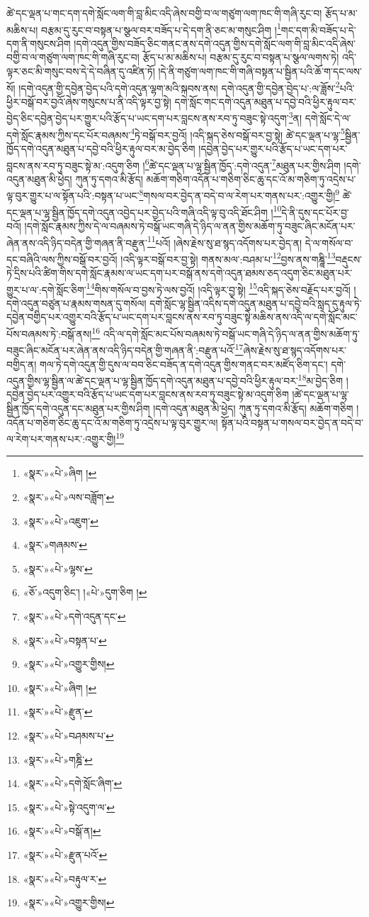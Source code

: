 ཚེ་དང་ལྡན་པ་གང་དག་དགེ་སློང་ལག་གི་བླ་མིང་འདི་ཞེས་བགྱི་བ་ལ་གཙུག་ལག་ཁང་གི་གཞི་རུང་བ། རྩོད་པ་མ་མཆིས་པ། བརྩམ་དུ་རུང་བ་བསྟན་པ་སྩལ་བར་བཟོད་པ་དེ་དག་ནི་ཅང་མ་གསུང་ཤིག །\footnote{«སྣར་»«པེ་»ཞིག །}གང་དག་མི་བཟོད་པ་དེ་དག་ནི་གསུངས་ཤིག །དགེ་འདུན་གྱིས་བཟོད་ཅིང་གནང་ནས་དགེ་འདུན་གྱིས་དགེ་སློང་ལག་གི་བླ་མིང་འདི་ཞེས་བགྱི་བ་ལ་གཙུག་ལག་ཁང་གི་གཞི་རུང་བ། རྩོད་པ་མ་མཆིས་པ། བརྩམ་དུ་རུང་བ་བསྟན་པ་སྩལ་ལགས་ཏེ། འདི་ལྟར་ཅང་མི་གསུང་བས་དེ་དེ་བཞིན་དུ་འཛིན་ཏོ། །དེ་ནི་གཙུག་ལག་ཁང་གི་གཞི་བསྟན་པ་སྦྱིན་པའི་ཆོ་ག་དང་ལས་སོ། །དགེ་འདུན་གྱི་དབྱེན་བྱེད་པའི་དགེ་འདུན་ལྷག་མའི་སྐབས་ནས། དགེ་འདུན་གྱི་དབྱེན་བྱེད་པ་:ལ་ཟློས་\footnote{«སྣར་»«པེ་»ལས་བཟློག་}པའི་ཕྱིར་བསྒོ་བར་བྱའོ་ཞེས་གསུངས་པ་ནི་འདི་ལྟར་བྱ་སྟེ། དགེ་སློང་གང་དགེ་འདུན་མཐུན་པ་དབྱེ་བའི་ཕྱིར་རྟུལ་བར་བྱེད་ཅིང་དབྱེན་བྱེད་པར་གྱུར་པའི་རྩོད་པ་ཡང་དག་པར་བླངས་ནས་རབ་ཏུ་བཟུང་སྟེ་འདུག་\footnote{«སྣར་»«པེ་»འཇུག་}ན། དགེ་སློང་དེ་ལ་དགེ་སློང་རྣམས་ཀྱིས་དང་པོར་བཞམས་\footnote{«སྣར་»གཞམས་}ཏེ་བསྒོ་བར་བྱའོ། །འདི་སྐད་ཅེས་བསྒོ་བར་བྱ་སྟེ། ཚེ་དང་ལྡན་པ་ལྷ་\footnote{«སྣར་»«པེ་»ལྷས་}སྦྱིན་ཁྱོད་དགེ་འདུན་མཐུན་པ་དབྱེ་བའི་ཕྱིར་རྟུལ་བར་མ་བྱེད་ཅིག །དབྱེན་བྱེད་པར་གྱུར་པའི་རྩོད་པ་ཡང་དག་པར་བླངས་ནས་རབ་ཏུ་བཟུང་སྟེ་མ་:འདུག་ཅིག །\footnote{«ཅོ་»འདུག་ཅིང་། །«པེ་»དུག་ཅིག །}ཚེ་དང་ལྡན་པ་ལྷ་སྦྱིན་ཁྱོད་:དགེ་འདུན་\footnote{«སྣར་»«པེ་»དགེ་འདུན་དང་}མཐུན་པར་གྱིས་ཤིག །དགེ་འདུན་མཐུན་མི་ཕྱེད། ཀུན་ཏུ་དགའ་མི་རྩོད། མཆོག་གཅིག་འདོན་པ་གཅིག་ཅིང་ཆུ་དང་འོ་མ་གཅིག་ཏུ་འདྲེས་པ་ལྟ་བུར་གྱུར་པ་ལ་སྟོན་པའི་:བསྟན་པ་ཡང་\footnote{«སྣར་»«པེ་»བསྟན་པ་}གསལ་བར་བྱེད་ན་བདེ་བ་ལ་རེག་པར་གནས་པར་:འགྱུར་གྱི།\footnote{«སྣར་»«པེ་»འགྱུར་གྱིས།} ཚེ་དང་ལྡན་པ་ལྷ་སྦྱིན་ཁྱོད་དགེ་འདུན་འབྱེད་པར་བྱེད་པའི་གཞི་འདི་ལྟ་བུ་འདི་ཐོང་ཤིག །\footnote{«སྣར་»«པེ་»ཞིག །}དེ་ནི་དུས་དང་པོར་བྱ་བའོ། །དགེ་སློང་རྣམས་ཀྱིས་དེ་ལ་བཞམས་ཏེ་བསྒོ་ཡང་གཞི་དེ་ཉིད་ལ་ནན་གྱིས་མཆོག་ཏུ་བཟུང་ཞིང་མངོན་པར་ཞེན་ནས་འདི་ཉིད་བདེན་གྱི་གཞན་ནི་བརྫུན་\footnote{«སྣར་»«པེ་»རྫུན་}པའོ། །ཞེས་རྗེས་སུ་ཐ་སྙད་འདོགས་པར་བྱེད་ན། དེ་ལ་གསོལ་བ་དང་བཞིའི་ལས་ཀྱིས་བསྒོ་བར་བྱའོ། །འདི་ལྟར་བསྒོ་བར་བྱ་སྟེ། གནས་མལ་:བཤམ་པ་\footnote{«སྣར་»«པེ་»བཤམས་པ་}བྱས་ནས་གཎྜཱི་\footnote{«སྣར་»«པེ་»གཎྜི་}བརྡུངས་ཏེ་དྲིས་པའི་ཚིག་གིས་དགེ་སློང་རྣམས་ལ་ཡང་དག་པར་བསྒོ་ནས་དགེ་འདུན་ཐམས་ཅད་འདུག་ཅིང་མཐུན་པར་གྱུར་པ་ལ་:དགེ་སློང་ཅིག་\footnote{«སྣར་»«པེ་»དགེ་སློང་ཞིག་}གིས་གསོལ་བ་བྱས་ཏེ་ལས་བྱའོ། །འདི་ལྟར་བྱ་སྟེ། \footnote{«སྣར་»«པེ་»སྟེ་འདུག་ལ་}འདི་སྐད་ཅེས་བརྗོད་པར་བྱའོ། །དགེ་འདུན་བཙུན་པ་རྣམས་གསན་དུ་གསོལ། དགེ་སློང་ལྷ་སྦྱིན་འདིས་དགེ་འདུན་མཐུན་པ་དབྱེ་བའི་སླད་དུ་རྟུལ་ཏེ་དབྱེན་བགྱིད་པར་འགྱུར་བའི་རྩོད་པ་ཡང་དག་པར་བླངས་ནས་རབ་ཏུ་བཟུང་སྟེ་མཆིས་ནས་འདི་ལ་དགེ་སློང་མང་པོས་བཞམས་ཏེ་:བསྒོ་ནས།\footnote{«སྣར་»«པེ་»བསྒོ་ན།} འདི་ལ་དགེ་སློང་མང་པོས་བཞམས་ཏེ་བསྒོ་ཡང་གཞི་དེ་ཉིད་ལ་ནན་གྱིས་མཆོག་ཏུ་བཟུང་ཞིང་མངོན་པར་ཞེན་ནས་འདི་ཉིད་བདེན་གྱི་གཞན་ནི་:བརྫུན་པའོ་\footnote{«སྣར་»«པེ་»རྫུན་པའོ་}ཞེས་རྗེས་སུ་ཐ་སྙད་འདོགས་པར་བགྱིད་ན། གལ་ཏེ་དགེ་འདུན་གྱི་དུས་ལ་བབ་ཅིང་བཟོད་ན་དགེ་འདུན་གྱིས་གནང་བར་མཛོད་ཅིག་དང་། དགེ་འདུན་གྱིས་ལྷ་སྦྱིན་ལ་ཚེ་དང་ལྡན་པ་ལྷ་སྦྱིན་ཁྱོད་དགེ་འདུན་མཐུན་པ་དབྱེ་བའི་ཕྱིར་རྟུལ་བར་\footnote{«སྣར་»«པེ་»བརྟུལ་ར་}མ་བྱེད་ཅིག །དབྱེན་བྱེད་པར་འགྱུར་བའི་རྩོད་པ་ཡང་དག་པར་བླངས་ནས་རབ་ཏུ་བཟུང་སྟེ་མ་འདུག་ཅིག །ཚེ་དང་ལྡན་པ་ལྷ་སྦྱིན་ཁྱོད་དགེ་འདུན་དང་མཐུན་པར་གྱིས་ཤིག །དགེ་འདུན་མཐུན་མི་ཕྱེད། ཀུན་ཏུ་དགའ་མི་རྩོད། མཆོག་གཅིག །འདོན་པ་གཅིག་ཅིང་ཆུ་དང་འོ་མ་གཅིག་ཏུ་འདྲེས་པ་ལྟ་བུར་གྱུར་ལ། སྟོན་པའི་བསྟན་པ་གསལ་བར་བྱེད་ན་བདེ་བ་ལ་རེག་པར་གནས་པར་:འགྱུར་གྱི།\footnote{«སྣར་»«པེ་»འགྱུར་གྱིས།} 